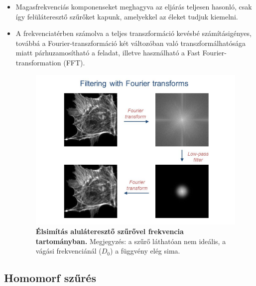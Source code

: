 \documentclass[12pt]{article}
\theoremstyle{plain}
\begin{document}
\begin{itemize}
\item Magasfrekvenciás komponenseket meghagyva az eljárás teljesen hasonló, csak így felüláteresztő szűrőket kapunk, amelyekkel az éleket tudjuk kiemelni. 
\item A frekvenciatérben számolva a teljes transzformáció kevésbé számításigényes, továbbá a Fourier-transzformáció két változóban való transzformálhatósága miatt párhuzamosítható a feladat, illetve használható a Fast Fourier-transformation (FFT). 

\begin{figure}[H]
    \begin{center}
    \includegraphics[width=0.75\linewidth]{media/filter.jpg}
    \caption{\textbf{Élsimítás aluláteresztő szűrővel frekvencia tartományban.} Megjegyzés: a szűrő láthatóan nem ideális, a vágási frekvenciánál ($D_0$) a függvény elég sima.} 
    \label{fig:filter}
    \end{center}
\end{figure}

\end{itemize}{}

\subsection{Homomorf szűrés}
\end{document}
